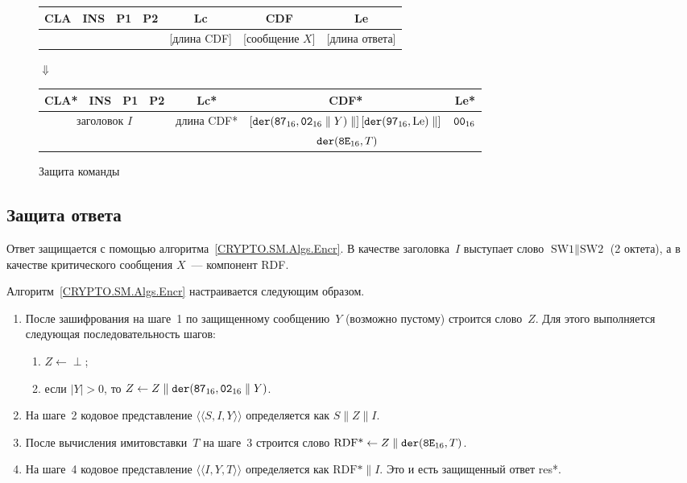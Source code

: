 \begin{figure}[!h]
\begin{center}
\begin{tabular}{|c|c|c|c|c|c|c|}
\hline
CLA & INS & P1 & P2 & Lc & CDF & Le \\
\hline
\hline
\multicolumn{4}{|c|}{} & [длина CDF] & [сообщение $X$] & [длина ответа]\\
\hline
\end{tabular}

\vskip3pt$\Downarrow$\vskip3pt

\begin{tabular}{|c|c|c|c|c|c|c|}
\hline
CLA* & INS & P1 & P2 & Lc* & CDF* & Le*\\
\hline
\hline
\multicolumn{4}{|c|}{заголовок $I$} & длина CDF* & 
$\left[\texttt{der}(\texttt{87}_{16},\texttt{02}_{16}\parallel Y)\parallel\right]
\left[\texttt{der}(\texttt{97}_{16},\text{Le})\parallel\right]$ & $\texttt{00}_{16}$\\
\multicolumn{4}{|c|}{} & & 
$\phantom{[}\texttt{der}(\texttt{8E}_{16},T)$\hfill\mbox{} &\\
\hline
\end{tabular}
\end{center}
\caption{Защита команды}\label{Fig.CMDS.CmdEncr}
\end{figure}

\subsection{Защита ответа}\label{CMDS.SM.EncrRez}

Ответ защищается с помощью алгоритма~\ref{CRYPTO.SM.Algs.Encr}. 
В качестве заголовка~$I$ выступает слово $\text{SW1} \parallel\text{SW2}$ 
(2 октета), а в качестве критического сообщения $X$~--- компонент RDF. 

Алгоритм~\ref{CRYPTO.SM.Algs.Encr} настраивается следующим образом.
\begin{enumerate}
\item
После зашифрования на шаге~1 по защищенному сообщению~$Y$
(возможно пустому) строится слово~$Z$. Для этого выполняется следующая 
последовательность шагов:
\begin{enumerate}
\item
$Z\gets\perp$;
\item
если $|Y|>0$, то $Z\gets Z\parallel\texttt{der}(\texttt{87}_{16},\texttt{02}_{16}\parallel Y)$.
\end{enumerate}
\item
На шаге~2 кодовое представление $\langle\langle S,I,Y\rangle\rangle$
определяется как $S\parallel Z\parallel I$.
\item
После вычисления имитовставки~$T$ на шаге~3 строится слово
$\text{RDF*}\gets Z\parallel \texttt{der}(\texttt{8E}_{16}, T)$.
\item
На шаге~4 кодовое представление $\langle\langle I,Y,T\rangle\rangle$
определяется как $\text{RDF*}\parallel I$.
Это и есть защищенный ответ res*.
\end{enumerate}

